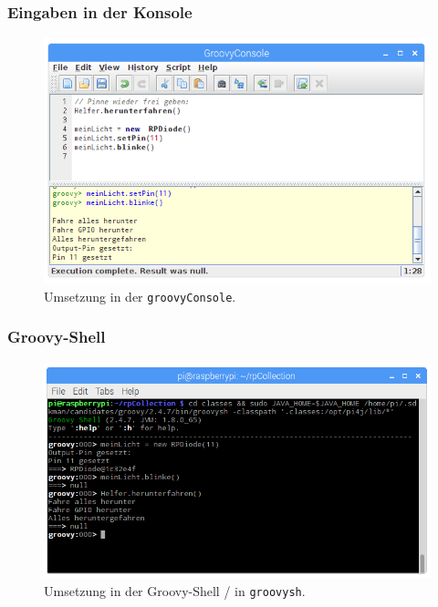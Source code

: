 \documentclass[usenames,dvipsnames]{beamer}
\begin{document}



\begin{frame}
\frametitle{Eingaben in der Konsole}
\vspace{-1.5em}
\begin{figure}[t]
	\centering
	\includegraphics[width=1.0\textwidth]{img/groovyConsole_rpCollection_blinkende_diode.png}
	\caption{Umsetzung in der \texttt{groovyConsole}.}
\end{figure}
\end{frame}


\begin{frame}
\frametitle{Groovy-Shell}
\vspace{-1.5em}
\begin{figure}[t]
	\centering
	\includegraphics[width=1.0\textwidth]{img/groovysh_rpCollection_blinkende_diode.png}
	\caption{Umsetzung in der Groovy-Shell / in \texttt{groovysh}.}
\end{figure}
\end{frame}
\end{document}
